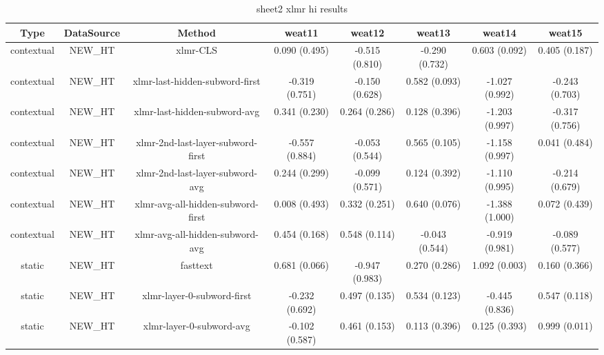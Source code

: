 \begin{sidewaystable}[htb]
    \centering
    \caption{sheet2 xlmr hi results}
    \label{appendix_tab:sheet2_xlmr_hi_results}
    \small
    \begin{tabular}{@{}cccccccc@{}}
        \toprule
        Type & DataSource & Method & weat11 & weat12 & weat13 & weat14 & weat15 \\
        \midrule
        contextual & NEW\_HT & xlmr-CLS & 0.090 (0.495) & -0.515 (0.810) & -0.290 (0.732) & 0.603 (0.092) & 0.405 (0.187) \\
        contextual & NEW\_HT & xlmr-last-hidden-subword-first & -0.319 (0.751) & -0.150 (0.628) & 0.582 (0.093) & -1.027 (0.992) & -0.243 (0.703) \\
        contextual & NEW\_HT & xlmr-last-hidden-subword-avg & 0.341 (0.230) & 0.264 (0.286) & 0.128 (0.396) & -1.203 (0.997) & -0.317 (0.756) \\
        contextual & NEW\_HT & xlmr-2nd-last-layer-subword-first & -0.557 (0.884) & -0.053 (0.544) & 0.565 (0.105) & -1.158 (0.997) & 0.041 (0.484) \\
        contextual & NEW\_HT & xlmr-2nd-last-layer-subword-avg & 0.244 (0.299) & -0.099 (0.571) & 0.124 (0.392) & -1.110 (0.995) & -0.214 (0.679) \\
        contextual & NEW\_HT & xlmr-avg-all-hidden-subword-first & 0.008 (0.493) & 0.332 (0.251) & 0.640 (0.076) & -1.388 (1.000) & 0.072 (0.439) \\
        contextual & NEW\_HT & xlmr-avg-all-hidden-subword-avg & 0.454 (0.168) & 0.548 (0.114) & -0.043 (0.544) & -0.919 (0.981) & -0.089 (0.577) \\
        static & NEW\_HT & fasttext & 0.681 (0.066) & -0.947 (0.983) & 0.270 (0.286) & 1.092 (0.003) & 0.160 (0.366) \\
        static & NEW\_HT & xlmr-layer-0-subword-first & -0.232 (0.692) & 0.497 (0.135) & 0.534 (0.123) & -0.445 (0.836) & 0.547 (0.118) \\
        static & NEW\_HT & xlmr-layer-0-subword-avg & -0.102 (0.587) & 0.461 (0.153) & 0.113 (0.396) & 0.125 (0.393) & 0.999 (0.011) \\
        \bottomrule
    \end{tabular}
\end{sidewaystable}